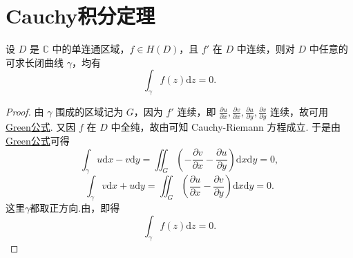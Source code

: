 \documentclass[../../main.tex]{subfiles}%
\begin{document}
\section{Cauchy积分定理}

\begin{theorem}[Cauchy定理]\label{theorem:Cauchy定理}
设 \( D \) 是 \( \mathbb{C} \) 中的单连通区域，\( f \in H(D) \)，且 \( f' \) 在 \( D \) 中连续，则对 \( D \) 中任意的可求长闭曲线 \( \gamma \)，均有
\[
\int_\gamma f(z)\mathrm{d}z = 0.
\]
\end{theorem}
\begin{proof}
  
由 \( \gamma \) 围成的区域记为 \( G \)，因为 \( f' \) 连续，即 \( \frac{\partial u}{\partial x}, \frac{\partial v}{\partial x}, \frac{\partial u}{\partial y}, \frac{\partial v}{\partial y} \) 连续，故可用 \hyperref[Basis Analytics-theorem:Green公式--数分]{Green公式}. 又因 \( f \) 在 \( D \) 中全纯，故由可知 Cauchy-Riemann 方程成立. 于是由\hyperref[Basis Analytics-theorem:Green公式--数分]{Green公式}可得
\[
\int_\gamma u \mathrm{d}x - v \mathrm{d}y = \iint_G \left( -\frac{\partial v}{\partial x} - \frac{\partial u}{\partial y} \right) \mathrm{d}x\mathrm{d}y = 0,
\]
\[
\int_\gamma v \mathrm{d}x + u \mathrm{d}y = \iint_G \left( \frac{\partial u}{\partial x} - \frac{\partial v}{\partial y} \right) \mathrm{d}x\mathrm{d}y = 0.
\]
这里$\gamma$都取正方向.由，即得
\[
\int_\gamma f(z)\mathrm{d}z = 0.
\]

\end{proof}
\end{document}
